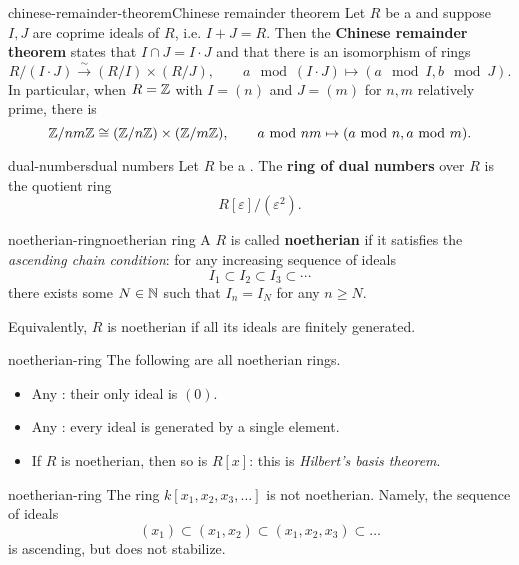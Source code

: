 \begin{topic}{chinese-remainder-theorem}{Chinese remainder theorem}
    Let $R$ be a  and suppose $I, J$ are coprime ideals of $R$, i.e. $I + J = R$. Then the \textbf{Chinese remainder theorem} states that $I \cap J = I \cdot J$ and that there is an isomorphism of rings
    \[ R / (I \cdot J) \xrightarrow{\sim} (R / I) \times (R/J), \qquad a \mod (I \cdot J) \mapsto (a \mod I, b \mod J) . \]
    In particular, when $R = \mathbb{Z}$ with $I = (n)$ and $J = (m)$ for $n, m$ relatively prime, there is
    \[ \mathbb{Z} / nm \mathbb{Z} \cong (\mathbb{Z}/n\mathbb{Z}) \times (\mathbb{Z}/m\mathbb{Z}), \qquad a \textup{ mod } nm \mapsto (a \textup{ mod } n, a \textup{ mod } m) . \]
\end{topic}

\begin{topic}{dual-numbers}{dual numbers}
    Let $R$ be a . The \textbf{ring of dual numbers} over $R$ is the quotient ring
    \[ R[\varepsilon] / (\varepsilon^2) . \]
\end{topic}

\begin{topic}{noetherian-ring}{noetherian ring}
    A  $R$ is called \textbf{noetherian} if it satisfies the \textit{ascending chain condition}: for any increasing sequence of ideals
    \[ I_1 \subset I_2 \subset I_3 \subset \cdots \]
    there exists some $N \in \mathbb{N}$ such that $I_n = I_N$ for any $n \ge N$.
    
    Equivalently, $R$ is noetherian if all its ideals are finitely generated.
\end{topic}

\begin{example}{noetherian-ring}
    The following are all noetherian rings.
    \begin{itemize}
        \item Any : their only ideal is $(0)$.
        \item Any : every ideal is generated by a single element.
        \item If $R$ is noetherian, then so is $R[x]$: this is \textit{Hilbert's basis theorem}.
    \end{itemize}
\end{example}

\begin{example}{noetherian-ring}
    The ring $k[x_1, x_2, x_3, \ldots]$ is not noetherian. Namely, the sequence of ideals
    \[ (x_1) \subset (x_1, x_2) \subset (x_1, x_2, x_3) \subset \ldots \]
    is ascending, but does not stabilize.
\end{example}

